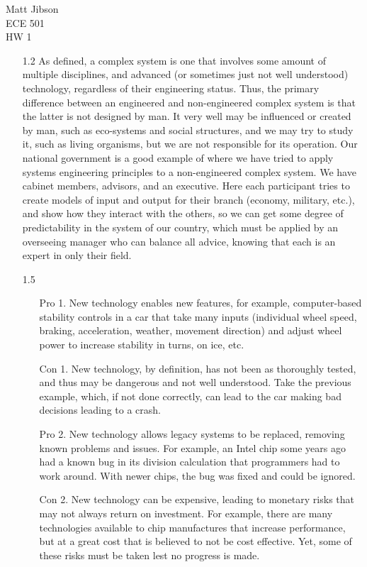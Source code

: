 \documentclass{article}
\begin{document}
\begin{flushright}
Matt Jibson \\
ECE 501 \\
HW 1
\end{flushright}

\begin{itemize}
	\item[1.2]
		As defined, a complex system is one that involves some amount of multiple disciplines, and advanced (or sometimes just not well understood) technology, regardless of their engineering status. Thus, the primary difference between an engineered and non-engineered complex system is that the latter is not designed by man. It very well may be influenced or created by man, such as eco-systems and social structures, and we may try to study it, such as living organisms, but we are not responsible for its operation. Our national government is a good example of where we have tried to apply systems engineering principles to a non-engineered complex system. We have cabinet members, advisors, and an executive. Here each participant tries to create models of input and output for their branch (economy, military, etc.), and show how they interact with the others, so we can get some degree of predictability in the system of our country, which must be applied by an overseeing manager who can balance all advice, knowing that each is an expert in only their field.

	\item[1.5] \
		\begin{itemize}
		\item[Pro 1.] New technology enables new features, for example, computer-based stability controls in a car that take many inputs (individual wheel speed, braking, acceleration, weather, movement direction) and adjust wheel power to increase stability in turns, on ice, etc.
		\item[Con 1.] New technology, by definition, has not been as thoroughly tested, and thus may be dangerous and not well understood. Take the previous example, which, if not done correctly, can lead to the car making bad decisions leading to a crash.
		\item[Pro 2.] New technology allows legacy systems to be replaced, removing known problems and issues. For example, an Intel chip some years ago had a known bug in its division calculation that programmers had to work around. With newer chips, the bug was fixed and could be ignored.
		\item[Con 2.] New technology can be expensive, leading to monetary risks that may not always return on investment. For example, there are many technologies available to chip manufactures that increase performance, but at a great cost that is believed to not be cost effective. Yet, some of these risks must be taken lest no progress is made.
		\end{itemize}


\end{itemize}
\end{document}
